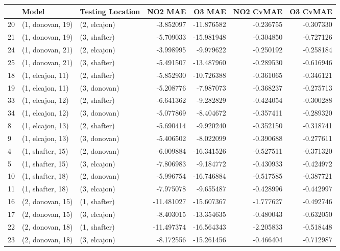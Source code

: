 \begin{tabular}{lllrrrr}
\toprule
{} &             Model & Testing Location &    NO2 MAE &     O3 MAE &  NO2 CvMAE &  O3 CvMAE \\
\midrule
20 &  (1, donovan, 19) &     (2, elcajon) &  -3.852097 & -11.876582 &  -0.236755 & -0.307330 \\
21 &  (1, donovan, 19) &     (3, shafter) &  -5.709033 & -15.981948 &  -0.304850 & -0.727126 \\
24 &  (1, donovan, 21) &     (2, elcajon) &  -3.998995 &  -9.979622 &  -0.250192 & -0.258184 \\
25 &  (1, donovan, 21) &     (3, shafter) &  -5.491507 & -13.487960 &  -0.289530 & -0.616946 \\
18 &  (1, elcajon, 11) &     (2, shafter) &  -5.852930 & -10.726388 &  -0.361065 & -0.346121 \\
19 &  (1, elcajon, 11) &     (3, donovan) &  -5.208776 &  -7.987073 &  -0.368237 & -0.275713 \\
33 &  (1, elcajon, 12) &     (2, shafter) &  -6.641362 &  -9.282829 &  -0.424054 & -0.300288 \\
34 &  (1, elcajon, 12) &     (3, donovan) &  -5.077869 &  -8.404672 &  -0.357411 & -0.289320 \\
8  &  (1, elcajon, 13) &     (2, shafter) &  -5.690414 &  -9.920240 &  -0.352150 & -0.318741 \\
9  &  (1, elcajon, 13) &     (3, donovan) &  -5.406502 &  -8.022099 &  -0.390688 & -0.277611 \\
4  &  (1, shafter, 15) &     (2, donovan) &  -6.009884 & -16.341526 &  -0.527511 & -0.371320 \\
5  &  (1, shafter, 15) &     (3, elcajon) &  -7.806983 &  -9.184772 &  -0.430933 & -0.424972 \\
10 &  (1, shafter, 18) &     (2, donovan) &  -5.996754 & -16.746884 &  -0.517585 & -0.387721 \\
11 &  (1, shafter, 18) &     (3, elcajon) &  -7.975078 &  -9.655487 &  -0.428996 & -0.442997 \\
16 &  (2, donovan, 15) &     (1, shafter) & -11.481027 & -15.607367 &  -1.777627 & -0.492746 \\
17 &  (2, donovan, 15) &     (3, elcajon) &  -8.403015 & -13.354635 &  -0.480043 & -0.632050 \\
22 &  (2, donovan, 18) &     (1, shafter) & -11.497374 & -16.564343 &  -2.205833 & -0.518448 \\
23 &  (2, donovan, 18) &     (3, elcajon) &  -8.172556 & -15.261456 &  -0.466404 & -0.712987 \\

\end{tabular}
